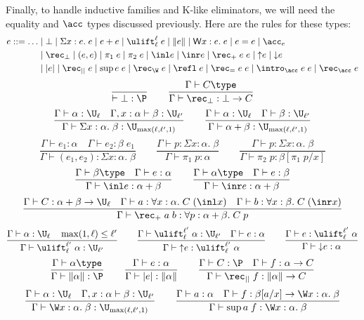 Finally, to handle inductive families and K-like eliminators, we will need the equality and $\acc$ types discussed previously. Here are the rules for these types:
\begin{align*}
e::=\dots&\mid\bot\mid\Sigma x:e.\;e\mid e+e\mid \ulift_{\ell}^{\ell}\;e\mid \|e\|\mid \mathsf{W} x:e.\;e\mid e=e\mid \acc_e\\
&\mid\rec_\bot\mid(e,e)\mid\pi_1\;e\mid\pi_2\;e\mid \inl e\mid \inr e\mid \rec_+\;e\;e\mid {\uparrow}e\mid {\downarrow}e\\
&\mid |e|\mid\rec_{||}\;e\mid\sup e\;e\mid\rec_\W\;e\mid \refl\;e\mid \rec_=\;e\;e\mid \intro_\acc\;e\;e\mid\rec_\acc\;e
\end{align*}
$$\frac{}{\vdash \bot:\P}\qquad
\frac{\Gamma\vdash C\type}{\Gamma\vdash \rec_\bot:\bot\to C}$$
$$\frac{\Gamma\vdash \alpha:\U_\ell\quad \Gamma,x:\alpha\vdash \beta:\U_{\ell'}}
{\Gamma\vdash \Sigma x:\alpha.\;\beta:\U_{\max(\ell,\ell',1)}}\qquad
\frac{\Gamma\vdash \alpha:\U_\ell\quad \Gamma\vdash \beta:\U_{\ell'}}
{\Gamma\vdash \alpha+\beta:\U_{\max(\ell,\ell',1)}}$$
$$\frac{\Gamma\vdash e_1:\alpha\quad \Gamma\vdash e_2:\beta\;e_1}
{\Gamma\vdash(e_1,e_2):\Sigma x:\alpha.\;\beta}\qquad
\frac{\Gamma\vdash p:\Sigma x:\alpha.\;\beta}{\Gamma\vdash \pi_1\;p:\alpha}\qquad
\frac{\Gamma\vdash p:\Sigma x:\alpha.\;\beta}
{\Gamma\vdash \pi_2\;p:\beta[\pi_1\;p/x]}$$
$$\frac{\Gamma\vdash \beta\type\quad \Gamma\vdash e:\alpha}{\Gamma\vdash \inl e:\alpha+\beta}\qquad
\frac{\Gamma\vdash \alpha\type\quad \Gamma\vdash e:\beta}{\Gamma\vdash \inr e:\alpha+\beta}$$
$$\frac{\Gamma\vdash C:\alpha+\beta\to\U_\ell\quad \Gamma\vdash a:\forall x:\alpha.\;C\;(\inl x)\quad \Gamma\vdash b:\forall x:\beta.\;C\;(\inr x)}{\Gamma\vdash \rec_+\;a\;b:\forall p:\alpha+\beta.\;C\;p}$$
$$\frac{\Gamma\vdash \alpha:\U_\ell\quad \max(1,\ell)\le\ell'}
{\Gamma\vdash\ulift_{\ell}^{\ell'}\;\alpha:\U_{\ell'}}\qquad
\frac{\Gamma\vdash\ulift_{\ell}^{\ell'}\;\alpha:\U_{\ell'}\quad \Gamma\vdash e:\alpha}{\Gamma\vdash {\uparrow}e:\ulift_{\ell}^{\ell'}\;\alpha}\qquad
\frac{\Gamma\vdash e:\ulift_{\ell}^{\ell'}\;\alpha}{\Gamma\vdash {\downarrow}e:\alpha}$$
$$\frac{\Gamma\vdash \alpha\type}
{\Gamma\vdash\|\alpha\|:\P}\qquad
\frac{\Gamma\vdash e:\alpha}{\Gamma\vdash |e|:\|\alpha\|}\qquad
\frac{\Gamma\vdash C:\P\quad \Gamma\vdash f:\alpha\to C}{\Gamma\vdash \rec_{||}\;f:\|\alpha\|\to C}$$
$$\frac{\Gamma\vdash \alpha:\U_\ell\quad \Gamma,x:\alpha\vdash\beta:\U_{\ell'}}
{\Gamma\vdash\W x:\alpha.\;\beta:\U_{\max(\ell,\ell',1)}}\qquad
\frac{\Gamma\vdash a:\alpha\quad\Gamma\vdash f:\beta[a/x]\to \W x:\alpha.\;\beta}{\Gamma\vdash\sup a\;f:\W x:\alpha.\;\beta}$$
